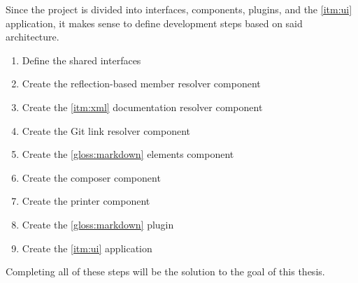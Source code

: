 Since the project is divided into interfaces, components, plugins, and the \ref{itm:ui} application, it makes sense to define development steps based on said architecture.

\begin{enumerate}
    \item Define the shared interfaces
    \item Create the reflection-based member resolver component
    \item Create the \ref{itm:xml} documentation resolver component
    \item Create the Git link resolver component
    \item Create the \ref{gloss:markdown} elements component
    \item Create the composer component
    \item Create the printer component
    \item Create the \ref{gloss:markdown} plugin
    \item Create the \ref{itm:ui} application
\end{enumerate}

Completing all of these steps will be the solution to the goal of this thesis.